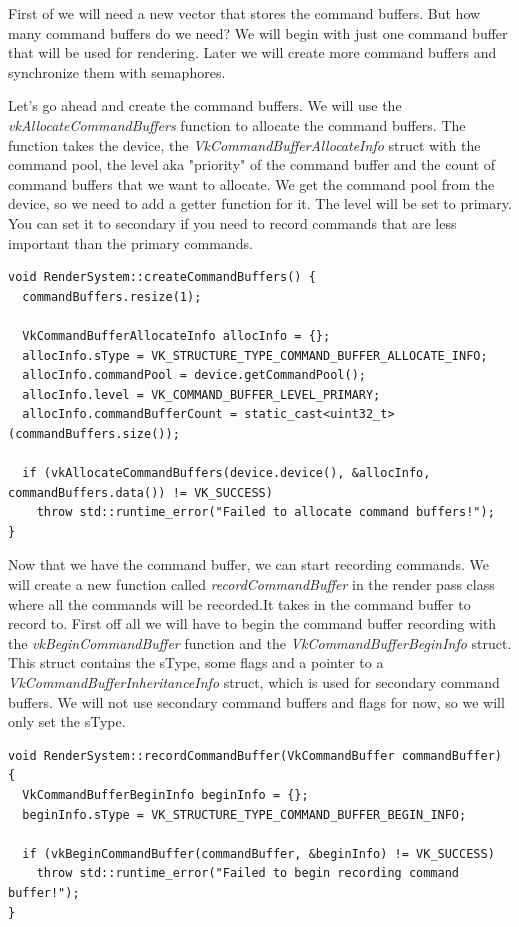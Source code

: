 \documentclass[12pt]{report} \usepackage{preamble}
\begin{document}
First of we will need a new vector that stores the command buffers. But how many command buffers do we need? We will begin with
just one command buffer that will be used for rendering. Later we will create more command buffers and synchronize them with
semaphores.

Let's go ahead and create the command buffers. We will use the \textit{vkAllocateCommandBuffers} function to allocate the
command buffers. The function takes the device, the \textit{VkCommandBufferAllocateInfo} struct with the command pool,
the level aka "priority" of the command buffer and the count of command buffers that we want to allocate. We get
the command pool from the device, so we need to add a getter function for it. The level will be set to primary. You can
set it to secondary if you need to record commands that are less important than the primary commands.

\begin{lstlisting}[Language=C++]
void RenderSystem::createCommandBuffers() {
  commandBuffers.resize(1);

  VkCommandBufferAllocateInfo allocInfo = {};
  allocInfo.sType = VK_STRUCTURE_TYPE_COMMAND_BUFFER_ALLOCATE_INFO;
  allocInfo.commandPool = device.getCommandPool();
  allocInfo.level = VK_COMMAND_BUFFER_LEVEL_PRIMARY;
  allocInfo.commandBufferCount = static_cast<uint32_t>(commandBuffers.size());

  if (vkAllocateCommandBuffers(device.device(), &allocInfo, commandBuffers.data()) != VK_SUCCESS)
    throw std::runtime_error("Failed to allocate command buffers!");
}
\end{lstlisting}

Now that we have the command buffer, we can start recording commands. We will create a new function called \textit{recordCommandBuffer}
in the render pass class where all the commands will be recorded.It takes in the command buffer to record to.
First off all we will have to begin the command buffer recording
with the \textit{vkBeginCommandBuffer} function and the \textit{VkCommandBufferBeginInfo} struct. This struct contains the sType,
some flags and a pointer to a \textit{VkCommandBufferInheritanceInfo} struct, which is used for secondary command buffers. We will
not use secondary command buffers and flags for now, so we will only set the sType.

\begin{lstlisting}[Language=C++]
void RenderSystem::recordCommandBuffer(VkCommandBuffer commandBuffer) {
  VkCommandBufferBeginInfo beginInfo = {};
  beginInfo.sType = VK_STRUCTURE_TYPE_COMMAND_BUFFER_BEGIN_INFO;

  if (vkBeginCommandBuffer(commandBuffer, &beginInfo) != VK_SUCCESS)
    throw std::runtime_error("Failed to begin recording command buffer!");
}
\end{lstlisting}
\end{document}
